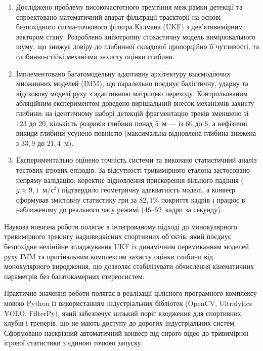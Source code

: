 \begin{unnumbered}
\begin{enumerate}
    \item Досліджено проблему високочастотного тремтіння меж рамки детекції та
    спроектовано математичний апарат фільтрації траєкторії на основі безпохідного
    сигма-точкового фільтра Калмана (\gls{UKF}) з дев'ятивимірним вектором стану.
    Розроблено анізотропну стохастичну модель вимірювального шуму, що знижує довіру до
    глибинної складової пропорційно її чутливості, та глибинно-стійкі механізми захисту
    оцінки глибини.

    \item Імплементовано багатомодельну адаптивну архітектуру взаємодіючих множинних
    моделей (\gls{IMM}), що паралельно поєднує балістичну, ударну та відскокову моделі
    руху з адаптивною матрицею переходу. Контрольованим абляційним експериментом доведено
    вирішальний внесок механізмів захисту глибини: на ідентичному наборі детекцій
    фрагментацію треків зменшено зі $123$ до $20$, кількість розривів глибини понад $5$~м ---
    із $60$ до $6$, а нефізичні викиди глибини усунено повністю (максимальна відновлена
    глибина знижена з $33{,}9$ до $21{,}4$~м).

    \item Експериментально оцінено точність системи та виконано статистичний аналіз
    тестових ігрових епізодів. За відсутності тривимірного еталона застосовано непряму
    валідацію: коректне відновлення прискорення вільного падіння ($g \approx 9{,}1$~м/с$^2$)
    підтвердило геометричну адекватність моделі, а конвеєр сформував змістовну статистику
    гри за $82{,}1\%$ покриття кадрів і працює в наближеному до реального часу режимі
    ($46$--$52$~кадри за секунду).
\end{enumerate}

Наукова новизна роботи полягає в інтегрованому підході до монокулярного тривимірного
трекінгу надшвидкісних спортивних об'єктів, який поєднує безпохідне нелінійне
згладжування \gls{UKF} із динамічним перемиканням моделей руху \gls{IMM} та оригінальним
комплексом захисту оцінки глибини від монокулярного виродження, що дозволяє стабілізувати
обчислення кінематичних параметрів без багатокамерних стереосистем.

Практичне значення роботи полягає в реалізації цілісного програмного комплексу мовою
Python із використанням індустріальних бібліотек (OpenCV, Ultralytics YOLO, FilterPy),
який забезпечує низький поріг входження для спортивних клубів і тренерів, що не мають
доступу до дорогих індустріальних систем. Сформовано наскрізний автоматичний конвеєр
від сирого відео до тривимірної ігрової статистики з єдиною точкою запуску.


\end{unnumbered}
